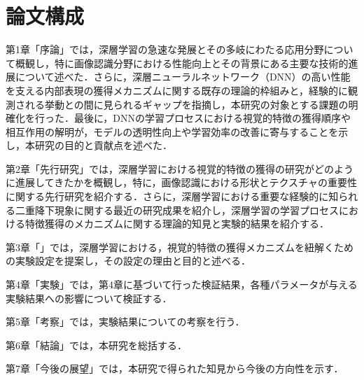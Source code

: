 \section{論文構成}
第1章「序論」では，深層学習の急速な発展とその多岐にわたる応用分野について概観し，特に画像認識分野における性能向上とその背景にある主要な技術的進展について述べた．さらに，深層ニューラルネットワーク（DNN）の高い性能を支える内部表現の獲得メカニズムに関する既存の理論的枠組みと，経験的に観測される挙動との間に見られるギャップを指摘し，本研究の対象とする課題の明確化を行った．最後に，DNNの学習プロセスにおける視覚的特徴の獲得順序や相互作用の解明が，モデルの透明性向上や学習効率の改善に寄与することを示し，本研究の目的と貢献点を述べた．\par
第2章「先行研究」では，深層学習における視覚的特徴の獲得の研究がどのように進展してきたかを概観し，特に，画像認識における形状とテクスチャの重要性に関する先行研究を紹介する．さらに，深層学習における重要な経験的に知られる二重降下現象に関する最近の研究成果を紹介し，深層学習の学習プロセスにおける特徴獲得のメカニズムに関する理論的知見と実験的結果を紹介する．\par
第3章「」では，深層学習における，視覚的特徴の獲得メカニズムを紐解くための実験設定を提案し，その設定の理由と目的と述べる．\par
第4章「実験」では，第4章に基づいて行った検証結果，各種パラメータが与える実験結果への影響について検証する．\par
第5章「考察」では，実験結果についての考察を行う．\par
第6章「結論」では，本研究を総括する．\par
第7章「今後の展望」では，本研究で得られた知見から今後の方向性を示す．\par
\newpage